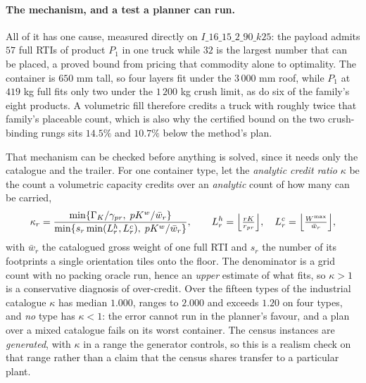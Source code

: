 \paragraph{The mechanism, and a test a planner can run.}
All of it has one cause, measured directly on
$I\_16\_15\_2\_90\_k25$: the payload admits $57$ full RTIs of product
$P_{1}$ in one truck while $32$ is the largest number that can be
placed, a proved bound from pricing that commodity alone to optimality.
The container is $650$ mm tall, so four layers fit under the
$3\,000$ mm roof, while $P_{1}$ at $419$ kg full fits only two under
the $1\,200$ kg crush limit, as do six of the family's eight products.
A volumetric fill therefore credits a truck with roughly twice that
family's placeable count, which is also why the certified bound on the
two crush-binding rungs sits $14.5\%$ and $10.7\%$ below the
method's plan.

That mechanism can be checked before anything is solved, since it needs
only the catalogue and the trailer. For one container type, let the
\emph{analytic credit ratio} $\kappa$ be the count a volumetric
capacity credits over an \emph{analytic} count of how many can be
carried,
\begin{equation}
\kappa_{r}=
\frac{\min\{\Gamma_{K}/\gamma_{pr},\;pK^{w}/\bar w_{r}\}}
     {\min\{s_{r}\min(L^{h}_{r},L^{c}_{r}),\;pK^{w}/\bar w_{r}\}},
\qquad
L^{h}_{r}=\Bigl\lfloor\tfrac{rK}{r_{pr}}\Bigr\rfloor,
\quad
L^{c}_{r}=\Bigl\lfloor\tfrac{W^{\max}}{\bar w_{r}}\Bigr\rfloor,
\label{eq:kappa}
\end{equation}
with $\bar w_{r}$ the catalogued gross weight of one full RTI and
$s_{r}$ the number of its footprints a single orientation tiles onto
the floor. The denominator is a grid count with no packing oracle run,
hence an \emph{upper} estimate of what fits, so $\kappa>1$ is a
conservative diagnosis of over-credit. Over the fifteen types of the
industrial catalogue $\kappa$ has median $1.000$, ranges to $2.000$ and
exceeds $1.20$ on four types, and \emph{no} type has $\kappa<1$: the
error cannot run in the planner's favour, and a plan over a mixed
catalogue fails on its worst container. The census instances are
\emph{generated}, with $\kappa$ in a range the generator controls, so
this is a realism check on that range rather than a claim that the
census shares transfer to a particular plant.